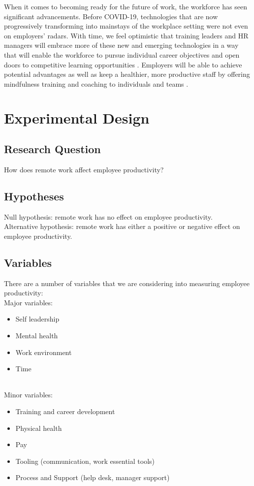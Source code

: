\documentclass[12pt]{article}
\begin{document}
When it comes to becoming ready for the future of work, the workforce has seen significant advancements. Before COVID-19, technologies that are now progressively transforming into mainstays of the workplace setting were not even on employers' radars. With time, we feel optimistic that training leaders and HR managers will embrace more of these new and emerging technologies in a way that will enable the workforce to pursue individual career objectives and open doors to competitive learning opportunities \cite{Kairinos2022}. Employers will be able to achieve potential advantages as well as keep a healthier, more productive staff by offering mindfulness training and coaching to individuals and teams \cite{Mariana}.

\section*{Experimental Design}

\subsection*{Research Question}
How does remote work affect employee productivity?

\subsection*{Hypotheses}
Null hypothesis: remote work has no effect on employee productivity. \\
Alternative hypothesis: remote work has either a positive or negative effect on employee productivity. 

\subsection*{Variables}
There are a number of variables that we are considering into measuring employee productivity: \\
Major variables:
\begin{itemize}
  \item Self leadership 
  \item Mental health 
  \item Work environment 
  \item Time
\end{itemize} \\
Minor variables:
\begin{itemize}
  \item Training and career development 
  \item Physical health 
  \item Pay
  \item Tooling (communication, work essential tools)
  \item Process and Support (help desk, manager support)
\end{itemize}
\end{document}

